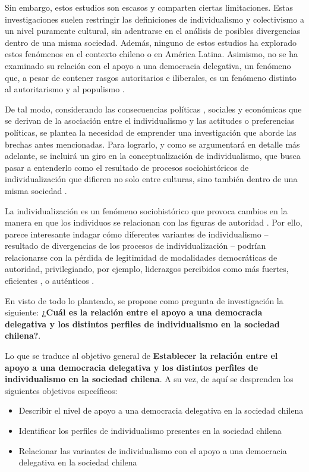\documentclass[12pt,twoside]{templates/facsothesis}
\providecommand{\tightlist}{%
  \setlength{\itemsep}{0pt}\setlength{\parskip}{0pt}}
\begin{document}
Sin embargo, estos estudios son escasos y comparten ciertas limitaciones. Estas investigaciones suelen restringir las definiciones de individualismo y colectivismo a un nivel puramente cultural, sin adentrarse en el análisis de posibles divergencias dentro de una misma sociedad. Además, ninguno de estos estudios ha explorado estos fenómenos en el contexto chileno o en América Latina. Asimismo, no se ha examinado su relación con el apoyo a una democracia delegativa, un fenómeno que, a pesar de contener rasgos autoritarios e iliberales, es un fenómeno distinto al autoritarismo y al populismo \citep{carlin2011, carlin2018}.

De tal modo, considerando las consecuencias políticas \citep{zhang2009}, sociales \citep{strunk1999} y económicas \citep{kyriacou2016} que se derivan de la asociación entre el individualismo y las actitudes o preferencias políticas, se plantea la necesidad de emprender una investigación que aborde las brechas antes mencionadas. Para lograrlo, y como se argumentará en detalle más adelante, se incluirá un giro en la conceptualización de individualismo, que busca pasar a entenderlo como el resultado de procesos sociohistóricos de individualización que difieren no solo entre culturas, sino también dentro de una misma sociedad \citep{martuccelli2018}.

La individualización es un fenómeno sociohistórico que provoca cambios en la manera en que los individuos se relacionan con las figuras de autoridad \citep{araujo2021}. Por ello, parece interesante indagar cómo diferentes variantes de individualismo -- resultado de divergencias de los procesos de individualización -- podrían relacionarse con la pérdida de legitimidad de modalidades democráticas de autoridad, privilegiando, por ejemplo, liderazgos percibidos como más fuertes, eficientes \citep{araujo2022, araujo2022a}, o auténticos \citep{gauthier2021}.

En visto de todo lo planteado, se propone como pregunta de investigación la siguiente: \textbf{¿Cuál es la relación entre el apoyo a una democracia delegativa y los distintos perfiles de individualismo en la sociedad chilena?}.

Lo que se traduce al objetivo general de \textbf{Establecer la relación entre el apoyo a una democracia delegativa y los distintos perfiles de individualismo en la sociedad chilena}. A su vez, de aquí se desprenden los siguientes objetivos específicos:

\begin{itemize}
\tightlist
\item
  Describir el nivel de apoyo a una democracia delegativa en la sociedad chilena
\item
  Identificar los perfiles de individualismo presentes en la sociedad chilena
\item
  Relacionar las variantes de individualismo con el apoyo a una democracia delegativa en la sociedad chilena
\end{itemize}
\end{document}
